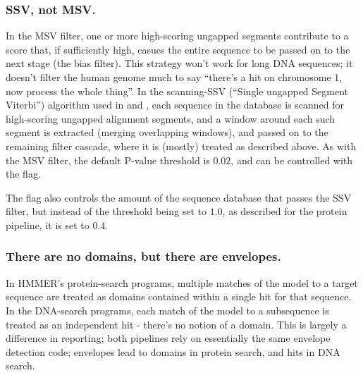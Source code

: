 \subsubsection{SSV, not MSV.}

In the MSV filter, one or more high-scoring ungapped segments contribute to a
score that, if sufficiently high, casues the entire sequence to be passed on to
the next stage (the bias filter). This strategy won't work for long
DNA sequences; it doesn't filter the human genome much to say ``there's a hit on
chromosome 1, now process the whole thing''. In the scanning-SSV (``Single
ungapped Segment Viterbi'') algorithm used in  and
, each sequence in the database is scanned for high-scoring
ungapped alignment segments, and a window around each such segment is extracted
(merging overlapping windows), and passed on to the remaining filter cascade,
where it is (mostly) treated as described above. As with the MSV filter, the
default P-value threshold is $0.02$, and can be controlled with the
 flag.

The  flag also controls the amount of the sequence database that
passes the SSV filter, but instead of the threshold being set to $1.0$, as
described for the protein pipeline, it is set to $0.4$.



\subsubsection{There are no domains, but there are envelopes.}

In HMMER's protein-search programs, multiple matches of the model to a target
sequence are treated as domains contained within a single hit for that
sequence. In the DNA-search programs, each match of the model to a subsequence
is treated as an independent hit - there's no notion of a domain. This is
largely a difference in reporting; both pipelines rely on essentially the same 
envelope detection code; envelopes lead to domains in protein search, and
hits in DNA search.



